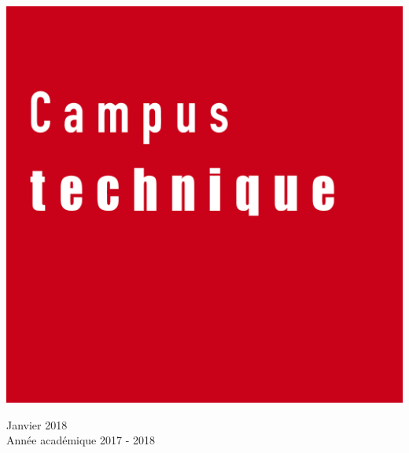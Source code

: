\begin{center}
  \vspace{1cm}

  \includegraphics[scale=0.08]{textures/logo/technical.pdf}

  \vspace{0.5cm}

  Janvier 2018 \\
  Année académique 2017 - 2018
\end{center}

\thispagestyle{empty}
